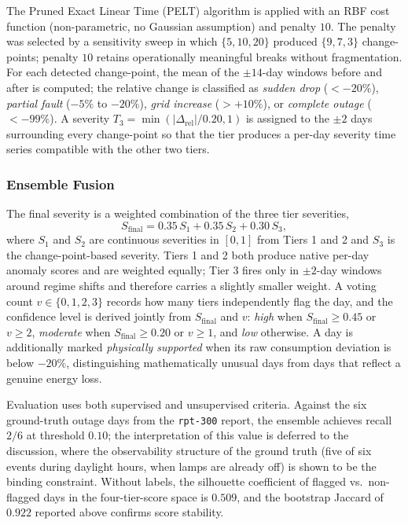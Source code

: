 \documentclass{article}
\begin{document}
The Pruned Exact Linear Time (PELT) algorithm \cite{killick2012pelt,truong2020ruptures} is applied with an RBF cost function (non-parametric, no Gaussian assumption) and penalty $10$. The penalty was selected by a sensitivity sweep in which $\{5,10,20\}$ produced $\{9,7,3\}$ change-points; penalty $10$ retains operationally meaningful breaks without fragmentation. For each detected change-point, the mean of the $\pm14$-day windows before and after is computed; the relative change is classified as \textit{sudden drop} ($<-20\%$), \textit{partial fault} ($-5\%$ to $-20\%$), \textit{grid increase} ($>+10\%$), or \textit{complete outage} ($<-99\%$). A severity $T_3=\min(|\Delta_{\text{rel}}|/0.20,1)$ is assigned to the $\pm2$ days surrounding every change-point so that the tier produces a per-day severity time series compatible with the other two tiers.

\subsubsection{Ensemble Fusion}

The final severity is a weighted combination of the three tier severities,
\[
S_{\text{final}}=0.35\,S_1+0.35\,S_2+0.30\,S_3,
\]
where $S_1$ and $S_2$ are continuous severities in $[0,1]$ from Tiers 1 and 2 and $S_3$ is the change-point-based severity. Tiers 1 and 2 both produce native per-day anomaly scores and are weighted equally; Tier 3 fires only in $\pm2$-day windows around regime shifts and therefore carries a slightly smaller weight. A voting count $v\in\{0,1,2,3\}$ records how many tiers independently flag the day, and the confidence level is derived jointly from $S_{\text{final}}$ and $v$: \textit{high} when $S_{\text{final}}\geq0.45$ or $v\geq2$, \textit{moderate} when $S_{\text{final}}\geq0.20$ or $v\geq1$, and \textit{low} otherwise. A day is additionally marked \textit{physically supported} when its raw consumption deviation is below $-20\%$, distinguishing mathematically unusual days from days that reflect a genuine energy loss.

Evaluation uses both supervised and unsupervised criteria. Against the six ground-truth outage days from the \texttt{rpt-300} report, the ensemble achieves recall $2/6$ at threshold $0.10$; the interpretation of this value is deferred to the discussion, where the observability structure of the ground truth (five of six events during daylight hours, when lamps are already off) is shown to be the binding constraint. Without labels, the silhouette coefficient \cite{rousseeuw1987silhouettes} of flagged vs.\ non-flagged days in the four-tier-score space is $0.509$, and the bootstrap Jaccard of $0.922$ reported above confirms score stability.
\end{document}
